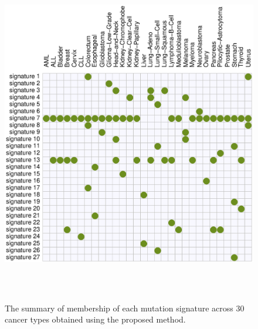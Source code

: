 \begin{figure}[b]
\centering
\includegraphics[width=15cm,height=15cm]{corrplot.eps}
\caption{The summary of membership of each mutation signature across 30 cancer types obtained using the proposed method.}
\label{nature2013_sig_member}
\end{figure}



\clearpage


